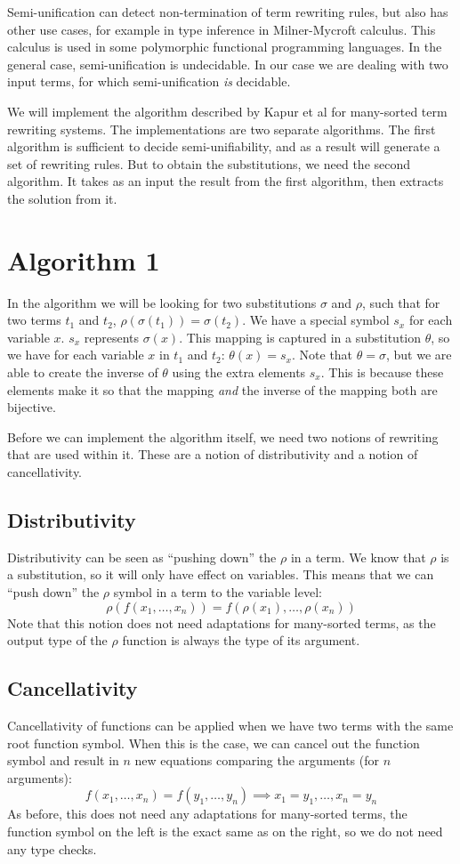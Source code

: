 Semi-unification can detect non-termination of term rewriting rules, but also has other use cases, for example in type inference in Milner-Mycroft calculus\cite{Henglein:1988}. This calculus is used in some polymorphic functional programming languages. In the general case, semi-unification is undecidable\cite{KFOURY:1993}. In our case we are dealing with two input terms, for which semi-unification \textit{is} decidable.

We will implement the algorithm described by Kapur et al for many-sorted term rewriting systems. The implementations are two separate algorithms. The first algorithm is sufficient to decide semi-unifiability, and as a result will generate a set of rewriting rules. But to obtain the substitutions, we need the second algorithm. It takes as an input the result from the first algorithm, then extracts the solution from it.

\section{Algorithm 1}
In the algorithm we will be looking for two substitutions $\sigma$ and $\rho$, such that for two terms $t_1$ and $t_2$, $\rho(\sigma(t_1)) = \sigma(t_2)$. We have a special symbol $s_x$ for each variable $x$. $s_x$ represents $\sigma(x)$. This mapping is captured in a substitution $\theta$, so we have for each variable $x$ in $t_1$ and $t_2$: $\theta(x) = s_x$. Note that $\theta = \sigma$, but we are able to create the inverse of $\theta$ using the extra elements $s_x$. This is because these elements make it so that the mapping \textit{and} the inverse of the mapping both are bijective. 

Before we can implement the algorithm itself, we need two notions of rewriting that are used within it. These are a notion of distributivity and a notion of cancellativity. 
\subsection{Distributivity}
Distributivity can be seen as ``pushing down'' the $\rho$ in a term. We know that $\rho$ is a substitution, so it will only have effect on variables. This means that we can ``push down'' the $\rho$ symbol in a term to the variable level:
$$ \rho(f(x_1, \dots, x_n)) = f(\rho(x_1), \dots, \rho(x_n)) $$
Note that this notion does not need adaptations for many-sorted terms, as the output type of the $\rho$ function is always the type of its argument. 
\subsection{Cancellativity}
Cancellativity of functions can be applied when we have two terms with the same root function symbol. When this is the case, we can cancel out the function symbol and result in $n$ new equations comparing the arguments (for $n$ arguments):
$$ f(x_1, \dots, x_n) = f(y_1, \dots, y_n) \implies x_1 = y_1, \dots, x_n = y_n $$
As before, this does not need any adaptations for many-sorted terms, the function symbol on the left is the exact same as on the right, so we do not need any type checks. 
